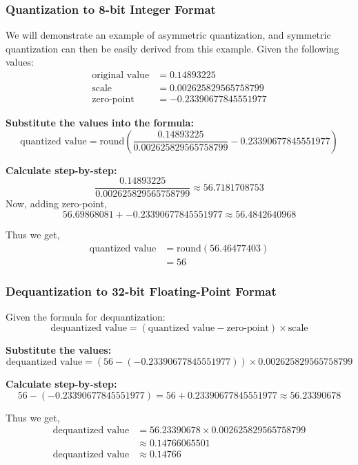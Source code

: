 \documentclass{ioereport}
\begin{document}
\subsubsection{Quantization to 8-bit Integer Format}
We will demonstrate an example of asymmetric quantization, and symmetric quantization can then be easily derived from this example.
Given the following values:
\begin{align}
\text{original value} &= 0.14893225 \\
\text{scale} &= 0.002625829565758799 \\
\text{zero-point} &= -0.23390677845551977
\end{align}

\textbf{Substitute the values into the formula:}
\[
\text{quantized value} = \text{round}\left(\frac{0.14893225}{0.002625829565758799} - 0.23390677845551977\right)
\]

\textbf{Calculate step-by-step:}
\[
\frac{0.14893225}{0.002625829565758799} \approx 56.7181708753
\]
Now, adding zero-point,
\[ 56.69868081 + -0.23390677845551977 \approx 56.4842640968 \]

Thus we get,
\begin{equation}
    \begin{aligned}
        \text{quantized value} &= \text{round}(56.46477403) \\
        &= \boxed{56}
    \end{aligned}
\end{equation}

\subsubsection{Dequantization to 32-bit Floating-Point Format}

Given the formula for dequantization:
\[
\text{dequantized value} = (\text{quantized value} - \text{zero-point}) \times \text{scale}
\]

\textbf{Substitute the values:}
\[
\text{dequantized value} = (56 - (-0.23390677845551977)) \times 0.002625829565758799
\]

\textbf{Calculate step-by-step:}
\[
56 - (-0.23390677845551977) = 56 + 0.23390677845551977
                         \approx 56.23390678
\]

Thus we get,
\begin{equation}
    \begin{aligned}
    \text{dequantized value} &= 56.23390678 \times 0.002625829565758799\\
                            &\approx 0.14766065501\\
    \text{dequantized value} &\approx \boxed{0.14766}
    \end{aligned}
\end{equation}
\end{document}
